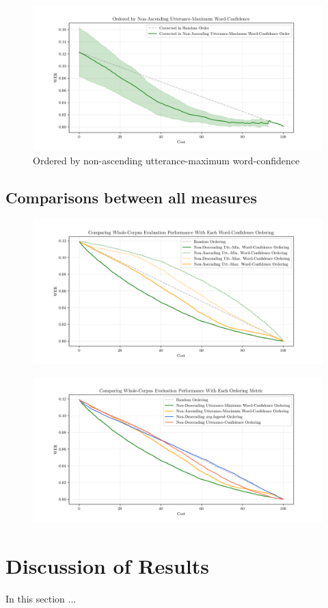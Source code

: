 \begin{figure}[p]
 \caption{Ordered by non-ascending utterance-maximum word-confidence}
 \label{fig:word-conf-comparison-plot4}
 \includegraphics[width=\textwidth]{figures/word-conf-comparison-plot4.png}
 \centering
\end{figure}

\clearpage
\subsection{Comparisons between all measures}

\begin{figure}[h!]
 \caption{}
 \label{fig:}
 \includegraphics[width=\textwidth]{figures/corpus-all-word-conf-measures.png}
 \centering
\end{figure}
\begin{figure}[h!]
 \caption{}
 \label{fig:}
 \includegraphics[width=\textwidth]{figures/corpus-allmeasures.png}
 \centering
\end{figure}

\clearpage
\section{Discussion of Results}
In this section ...

